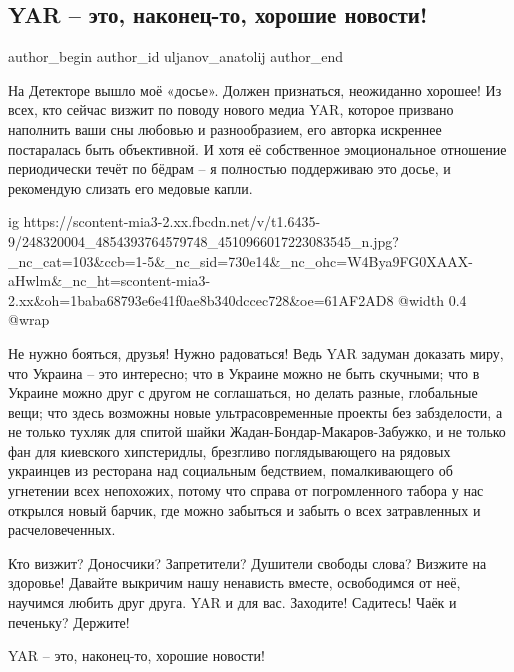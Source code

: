  
 
 
 
 
 
\subsection{YAR – это, наконец-то, хорошие новости!}
\label{sec:25_10_2021.fb.uljanov_anatolij.1.yar_novosti_horoshie}
 
\ifcmt
 author_begin
   author_id uljanov_anatolij
 author_end
\fi

На Детекторе вышло моё «досье». Должен признаться, неожиданно хорошее! Из всех,
кто сейчас визжит по поводу нового медиа YAR, которое призвано наполнить ваши
сны любовью и разнообразием, его авторка искреннее постаралась быть
объективной. И хотя её собственное эмоциональное отношение периодически течёт
по бёдрам – я полностью поддерживаю это досье, и рекомендую слизать его медовые
капли. 

\ifcmt
  ig https://scontent-mia3-2.xx.fbcdn.net/v/t1.6435-9/248320004_4854393764579748_4510966017223083545_n.jpg?_nc_cat=103&ccb=1-5&_nc_sid=730e14&_nc_ohc=W4Bya9FG0XAAX-aHwlm&_nc_ht=scontent-mia3-2.xx&oh=1baba68793e6e41f0ae8b340dccec728&oe=61AF2AD8
  @width 0.4
  @wrap 
\fi

Не нужно бояться, друзья! Нужно радоваться! Ведь YAR задуман доказать миру, что
Украина – это интересно; что в Украине можно не быть скучными; что в Украине
можно друг с другом не соглашаться, но делать разные, глобальные вещи; что
здесь возможны новые ультрасовременные проекты без забзделости, а не только
тухляк для спитой шайки Жадан-Бондар-Макаров-Забужко, и не только фан для
киевского хипстеридлы, брезгливо поглядывающего на рядовых украинцев из
ресторана над социальным бедствием, помалкивающего об угнетении всех непохожих,
потому что справа от погромленного табора у нас открылся новый барчик, где
можно забыться и забыть о всех затравленных и расчеловеченных.

Кто визжит? Доносчики? Запретители? Душители свободы слова? Визжите на
здоровье! Давайте выкричим нашу ненависть вместе, освободимся от неё, научимся
любить друг друга. YAR и для вас. Заходите! Садитесь! Чаёк и печеньку? Держите!

YAR – это, наконец-то, хорошие новости!
